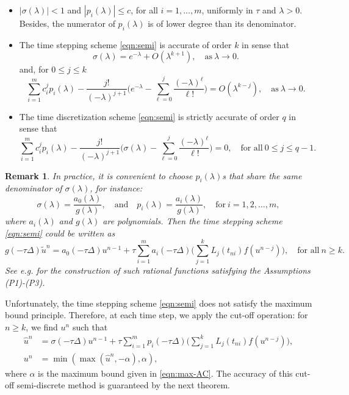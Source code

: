 \documentclass[10pt,final,leqno,onefignum,onetabnum]{siamltex}%
\newtheorem{remark}{Remark}[section]
\begin{document}
\begin{itemize}
\item[{\bf (P1)}] $|\sigma(\lambda)|< 1$ and $|p_i(\lambda)|\le c$, for all $i=1,\ldots,m$,
uniformly in $\tau$ and $\lambda > 0$. Besides, the numerator of $p_i(\lambda)$
is of lower degree than its denominator.
\item[{\bf (P2)}] The time stepping scheme \eqref{eqn:semi}  is accurate of order $k$ in sense that
$$ \sigma(\lambda) = e^{-\lambda} + O(\lambda^{k+1}),\quad \text{as}~\lambda\rightarrow0. $$
and, for $0\le j\le k$
$$ \sum_{i=1}^m c_i^j p_i(\lambda) - \frac{j!}{(-\lambda)^{j+1}}\Big(e^{-\lambda}
- \sum_{\ell=0}^j \frac{(-\lambda)^\ell}{\ell!}\Big) = O(\lambda^{k-j}),\quad \text{as}~\lambda\rightarrow0. $$
\item[{\bf (P3)}] The time discretization scheme \eqref{eqn:semi} is strictly accurate of order $q$ in sense that
$$ \sum_{i=1}^m c_i^j p_i(\lambda) - \frac{j!}{(-\lambda)^{j+1}}\Big(\sigma(\lambda)
- \sum_{\ell=0}^j \frac{(-\lambda)^\ell}{\ell!}\Big) =0,\quad\text{for all}~ 0\le j\le q-1. $$
\end{itemize}

\begin{remark}
In practice,
it is convenient to choose $p_i(\lambda)$s that share the same denominator of $\sigma(\lambda)$, for instance:
$$\sigma(\lambda) = \frac{a_0(\lambda)}{g(\lambda)},\quad \text{and} \quad p_i(\lambda) = \frac{a_i(\lambda)}{g(\lambda)},\quad \text{for}~i=1,2,\ldots,m,$$
where $a_i(\lambda)$ and $g(\lambda)$ are polynomials.
Then the time stepping scheme \eqref{eqn:semi} could be written as
\begin{equation*}
g(-\tau\Delta)\tilde u^{n} = a_0(-\tau\Delta) u^{n-1} + \tau \sum_{i=1}^m a_i(-\tau \Delta)
\Big(\sum_{j=1}^{k} L_j (t_{ni}) f(u^{n-j})\Big),\quad \text{for all}~n\ge k.
\end{equation*}
See e.g. \cite[pp. 131]{Thomee:2006} for the construction of such rational functions satisfying the Assumptions (P1)-(P3).
\end{remark}


Unfortunately, the time stepping scheme \eqref{eqn:semi} does not satisfy the maximum bound principle. Therefore,
at each time step, we apply the cut-off operation: for $n\ge k$, we find $u^n$ such that
\begin{align}
\hat u^{n} &= \sigma(-\tau\Delta) u^{n-1} + \tau \sum_{i=1}^m p_i(-\tau \Delta)
\Big(\sum_{j=1}^{k} L_j (t_{ni}) f(u^{n-j})\Big),\label{eqn:semi-1}\\
u^{n} &=  \min(\max(\hat u^{n},-\alpha),\alpha),\label{eqn:semi-cut}
\end{align}
where $\alpha$ is the maximum bound given in \eqref{eqn:max-AC}.
The accuracy of this cut-off semi-discrete method is guaranteed by the next theorem.
\end{document}
